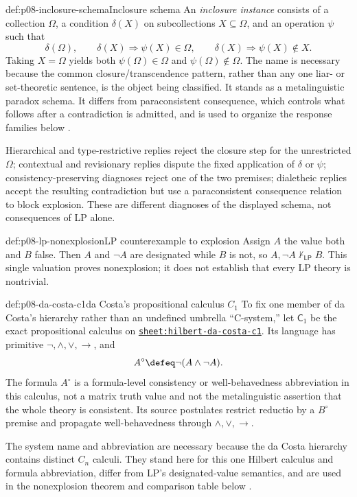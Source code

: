 \begin{hbdefinition}{def:p08-inclosure-schema}{Inclosure schema}
An \emph{inclosure instance} consists of a collection \(\Omega\), a condition
\(\delta(X)\) on subcollections \(X\subseteq\Omega\), and an operation
\(\psi\) such that
\[
 \delta(\Omega),\qquad
 \delta(X)\Longrightarrow\psi(X)\in\Omega,
 \qquad
 \delta(X)\Longrightarrow\psi(X)\notin X.
\]
Taking \(X=\Omega\) yields both
\(\psi(\Omega)\in\Omega\) and
\(\psi(\Omega)\notin\Omega\).  The name is necessary because the common
closure/transcendence pattern, rather than any one liar- or set-theoretic
sentence, is the object being classified.  It stands as a metalinguistic
paradox schema.  It differs from paraconsistent consequence, which controls
what follows after a contradiction is admitted, and is used to organize the
response families below \cite{Priest2006}.
\end{hbdefinition}

Hierarchical and type-restrictive replies reject the closure step for the
unrestricted \(\Omega\); contextual and revisionary replies dispute the fixed
application of \(\delta\) or \(\psi\); consistency-preserving diagnoses reject
one of the two premises; dialetheic replies accept the resulting contradiction
but use a paraconsistent consequence relation to block explosion.  These are
different diagnoses of the displayed schema, not consequences of LP alone.

\begin{hbexample}{def:p08-lp-nonexplosion}{LP counterexample to explosion}
Assign \(A\) the value both and \(B\) false. Then \(A\) and \(\neg A\) are
designated while \(B\) is not, so \(A,\neg A\nvdash_{\mathsf{LP}}B\). This
single valuation proves nonexplosion; it does not establish that every LP
theory is nontrivial.
\end{hbexample}

\begin{hbdefinition}{def:p08-da-costa-c1}{da Costa's propositional calculus \(C_1\)}
To fix one member of da Costa's hierarchy rather than an undefined umbrella
``C-system,'' let \(\mathsf C_1\) be the exact propositional calculus on
\hyperref[sheet:hilbert-da-costa-c1]{\texttt{sheet:hilbert-da-costa-c1}}.
Its language has primitive \(\neg,\land,\lor,\to\), and
\[
 A^\circ\defeq\neg(A\land\neg A).
\]
The formula \(A^\circ\) is a formula-level consistency or well-behavedness
abbreviation in this calculus, not a matrix truth value and not the
metalinguistic assertion that the whole theory is consistent.  Its source
postulates restrict reductio by a \(B^\circ\) premise and propagate
well-behavedness through \(\land,\lor,\to\).

The system name and abbreviation are necessary because the da Costa hierarchy
contains distinct \(C_n\) calculi.  They stand here for this one Hilbert
calculus and formula abbreviation, differ from LP's designated-value
semantics, and are used in the nonexplosion theorem and comparison table below
\cite{daCosta1974}.
\end{hbdefinition}

